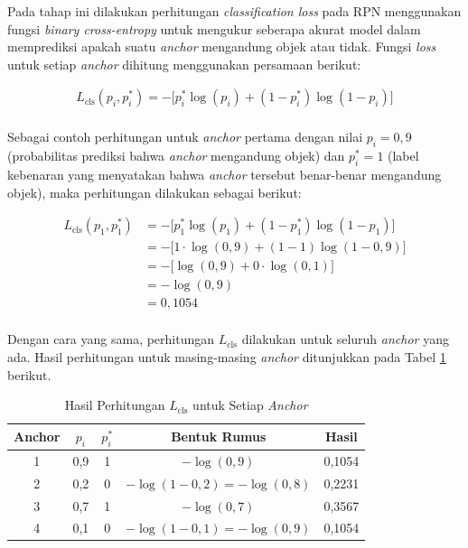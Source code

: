 Pada tahap ini dilakukan perhitungan \textit{classification loss} pada RPN menggunakan fungsi \textit{binary cross-entropy} untuk mengukur seberapa akurat model dalam memprediksi apakah suatu \textit{anchor} mengandung objek atau tidak. Fungsi \textit{loss} untuk setiap \textit{anchor} dihitung menggunakan persamaan berikut:

\begin{align*}
    L_{\text{cls}}(p_i, p_i^*) = -\Big[p_i^* \log(p_i) + (1 - p_i^*) \log(1 - p_i)\Big] \\
\end{align*}

Sebagai contoh perhitungan untuk \textit{anchor} pertama dengan nilai $p_i = 0{,}9$ (probabilitas prediksi bahwa \textit{anchor} mengandung objek) dan $p_i^* = 1$ (label kebenaran yang menyatakan bahwa \textit{anchor} tersebut benar-benar mengandung objek), maka perhitungan dilakukan sebagai berikut:

\begin{align*}
    L_{\text{cls}}(p_1, p_1^*) &= -\Big[p_1^* \log(p_1) + (1 - p_1^*) \log(1 - p_1)\Big] \\[0.5em]
     &= -\Big[1 \cdot \log(0{,}9) + (1 - 1) \log(1 - 0{,}9)\Big] \\[0.5em]
     &= -\Big[\log(0{,}9) + 0 \cdot \log(0{,}1)\Big] \\[0.5em]
     &= -\log(0{,}9) \\[0.5em]
     &= 0{,}1054 \\[0.5em]
\end{align*}

Dengan cara yang sama, perhitungan $L_{\text{cls}}$ dilakukan untuk seluruh \textit{anchor} yang ada. Hasil perhitungan untuk masing-masing \textit{anchor} ditunjukkan pada Tabel \ref{table:3.hasil-cls-rpn} berikut.

\begin{table}[H]
\centering
\caption{Hasil Perhitungan $L_{\text{cls}}$ untuk Setiap \textit{Anchor}}
\renewcommand{\arraystretch}{1.3}
\label{table:3.hasil-cls-rpn}
\begin{tabular}{|c|c|c|c|c|}
\hline
\textbf{Anchor} & \textbf{$p_i$} & \textbf{$p_i^*$} & \textbf{Bentuk Rumus} & \textbf{Hasil} \\
\hline
1 & 0{,}9 & 1 & $-\log(0{,}9)$ & 0{,}1054 \\
\hline
2 & 0{,}2 & 0 & $-\log(1-0{,}2) = -\log(0{,}8)$ & 0{,}2231 \\
\hline
3 & 0{,}7 & 1 & $-\log(0{,}7)$ & 0{,}3567 \\
\hline
4 & 0{,}1 & 0 & $-\log(1-0{,}1) = -\log(0{,}9)$ & 0{,}1054 \\
\hline
\end{tabular}
\end{table}

